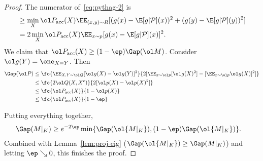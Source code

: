 \begin{proof}
The numerator of~\eqref{eq:pythag-2} is 
\begin{align}
 &\ge 
\min_X\ol P_{\text{acc}}(X) \EE_{(x,y)\sim R} [(g(x)-\E[g|\cal P](x))^2 + (g(y)-\E[g|\cal P](y))^2]\\
&= 2\min_X \ol P_{\text{acc}}(X) \EE_{x\sim p}[g(x)-\E[g|\cal P](x)]^2.
\end{align}
We claim that $\ol P_{\text{acc}}(X) \ge (1-\ep)\Gap(\ol M)$. Consider $\ol g(Y) = \one_{X=Y}$. 
Then 
\begin{align}
\Gap(\ol P) &\le 
\fc{\EE_{X,Y\sim \ol Q} [\ol g(X)-\ol g(Y)]^2}
{2[\EE_{x\sim \ol p}[\ol g(X)^2] - [\EE_{x\sim \ol p} \ol g(X)]^2]}\\
&\le \fc{2\ol Q(X,X^c)}{2[\ol p(X)-\ol p(X)^2]}\\
&\le \fc{\ol P_{\text{acc}}(X)}{1-\ol p(X)}\\
&\le  \fc{\ol P_{\text{acc}}(X)}{1-\ep}
\end{align}
 
%
Putting everything together, 
\begin{align}
\Gap(M|_K) &\ge e^{-2\ep}\min\{\Gap(\ol{M|_K}), (1-\ep) \Gap(\ol{M|_K})\}.
\end{align}
Combined with Lemma~\ref{lem:proj-eig} ($\Gap(\ol{M|_K})\ge \Gap(M|_K)$) and letting $\ep\searrow0$, this finishes the proof.
\end{proof}

